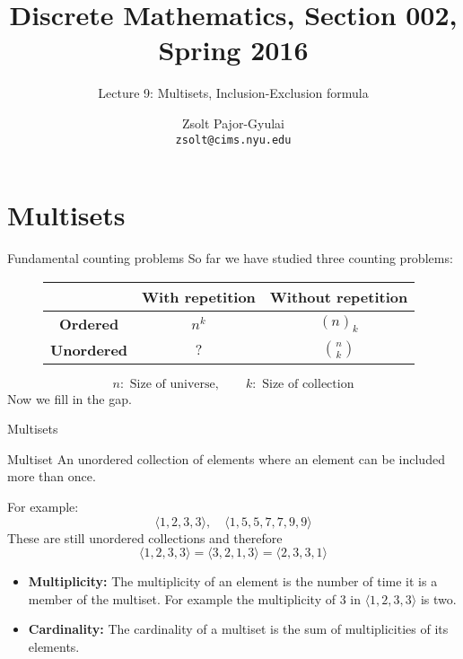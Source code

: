 \documentclass{beamer}
\title{Discrete Mathematics, Section 002, Spring 2016}
\subtitle{Lecture 9: Multisets, Inclusion-Exclusion formula}
\author[Zsolt]{Zsolt Pajor-Gyulai \\ \texttt{zsolt@cims.nyu.edu}}
\institute[NYU] 
{
\normalsize Courant Institute of Mathematical Sciences
}
\def\bl[#1]#2{\begin{block}{#1}#2\end{block}}
\def\itemb{\begin{itemize}}
\def\iteme{\end{itemize}}
\begin{document}
\begin{frame}
  \titlepage
\end{frame}


\section{Multisets}
\begin{frame}{Fundamental counting problems}
So far we have studied three counting problems:

\begin{figure}
\centering
\begin{tabular}{|c|c|c|}
\hline
&With repetition&Without repetition\\
\hline
\textbf{Ordered}&$n^k$&$(n)_k$\\
\hline
\textbf{Unordered}&$?$&$\binom{n}{k}$\\
\hline
\end{tabular}
\end{figure}
\[
n:\textrm{ Size of universe},\qquad k: \textrm{ Size of collection}
\]
Now we fill in the gap.
\end{frame}

\begin{frame}{Multisets}
\vspace{-0.2cm}

\bl[Multiset]{
An unordered collection of elements where an element can be included more than once.
}
For example: 
\[
\langle 1,2,3,3\rangle,\quad \langle 1, 5, 5, 7, 7, 9, 9\rangle
\]
These are still unordered collections and therefore
\[
\langle 1,2,3,3\rangle=\langle 3,2,1, 3\rangle=\langle 2, 3, 3, 1\rangle
\]\vspace{-0.6cm}
\itemb
\item \textbf{Multiplicity:} The multiplicity of an element is the number of time it is a member of the multiset.
For example the multiplicity of $3$ in $\langle 1,2,3,3\rangle$ is two.
\item \textbf{Cardinality:} The cardinality of a multiset is the sum of multiplicities of its elements.
\iteme
\end{frame}
\end{document}
